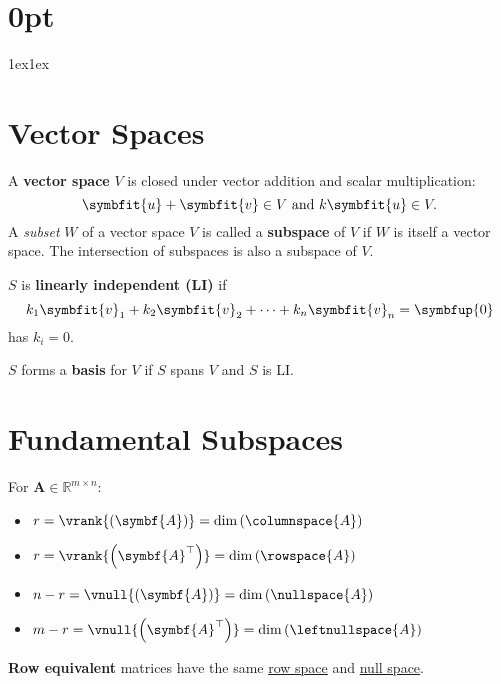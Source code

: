 \documentclass{article}
\begin{document}
\titlespacing*\section{0pt}{1ex}{1ex}
%
\setlength{\textfloatsep}{0pt}
%
\setlength{\abovedisplayskip}{1pt}
\setlength{\belowdisplayskip}{1pt}
%
\begin{minipage}[t]{62.39259259mm}
    \section*{Vector Spaces}
    A \textbf{vector space} \(V\) is closed under vector addition
    and scalar multiplication:
    \begin{equation*}
        \symbfit{u}+\symbfit{v} \in V \ \text{and} \ k\symbfit{u} \in V.
    \end{equation*}
    A \textit{subset} \(W\) of a vector space \(V\) is called a
    \textbf{subspace} of \(V\) if \(W\) is itself a vector space. The
    intersection of subspaces is also a subspace of \(V\).

    \(S\) is \textbf{linearly independent (LI)} if
    \begin{equation*}
        k_1 \symbfit{v}_1 + k_2 \symbfit{v}_2 + \cdots + k_n \symbfit{v}_n = \symbfup{0}
    \end{equation*}
    has \(k_i=0\).

    \(S\) forms a \textbf{basis} for \(V\) if \(S\) spans \(V\) and \(S\) is LI\@.
    \section*{Fundamental Subspaces}
    For \(\symbf{A}\in\mathbb{R}^{m \times n}\):
    \begin{itemize}
        \item \(r = \vrank{\left( \symbf{A} \right)} = \dim{\left( \columnspace{A} \right)}\)
        \item \(r = \vrank{\left( \symbf{A}^\top \right)} = \dim{\left( \rowspace{A} \right)}\)
        \item \(n - r = \vnull{\left( \symbf{A} \right)}      = \dim{\left( \nullspace{A} \right)}\)
        \item \(m - r = \vnull{\left( \symbf{A}^\top \right)} = \dim{\left( \leftnullspace{A} \right)}\)
    \end{itemize}
    \textbf{Row equivalent} matrices have the same
    \underline{row space} and \underline{null space}.

\end{minipage}
\end{document}

